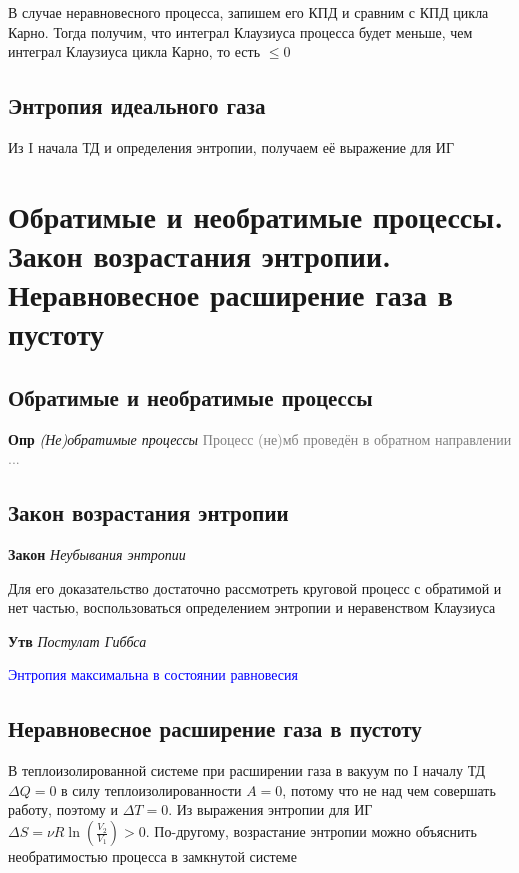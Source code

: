 \documentclass[a4paper, 14pt]{article}
\begin{document}
    В случае неравновесного процесса, запишем его КПД и сравним с КПД цикла Карно.
    Тогда получим, что интеграл Клаузиуса процесса будет меньше, чем интеграл Клаузиуса цикла Карно, то есть $\leq 0$

    \subsection{Энтропия идеального газа}

    Из I начала ТД и определения энтропии, получаем её выражение для ИГ

    \section{Обратимые и необратимые процессы.
    Закон возрастания энтропии.
    Неравновесное расширение газа в пустоту}

    \subsection{Обратимые и необратимые процессы}

    \textbf{Опр} \textit{(Не)обратимые процессы} \textcolor{gray}{Процесс (не)мб проведён в обратном направлении ...}

    \subsection{Закон возрастания энтропии}

    \textbf{Закон} \textit{Неубывания энтропии}

    Для его доказательство достаточно рассмотреть круговой процесс с обратимой и нет частью, воспользоваться
    определением энтропии и неравенством Клаузиуса

    \textbf{Утв} \textit{Постулат Гиббса}

    \textcolor{blue}{Энтропия максимальна в состоянии равновесия}

    \subsection{Неравновесное расширение газа в пустоту}

    В теплоизолированной системе при расширении газа в вакуум по I началу ТД $\Delta Q = 0$ в силу
    теплоизолированности $A = 0$, потому что не над чем совершать работу, поэтому и $\Delta T = 0$.
    Из выражения энтропии для ИГ $\Delta S = \nu R \ln (\frac{V_2}{V_1}) > 0$.
    По-другому, возрастание энтропии можно объяснить необратимостью процесса в замкнутой системе
\end{document}
